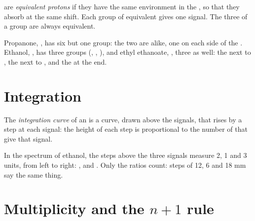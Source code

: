 \begin{definition}\label{def:g12:proton-nmr:equivalent}
 are \emph{equivalent protons} if they
have the same environment in the , so that they absorb at the
same shift. Each group of equivalent  gives one signal. The three
 of a  group are always equivalent.
\end{definition}

\begin{example}\label{ex:g12:proton-nmr:groups}
Propanone, , has six  but one group: the two
 are alike, one on each side of the . Ethanol,
, has three groups (, , ), and
ethyl ethanoate, , three as well: the 
next to , the  next to , and the  at the
end.
\end{example}

\section{Integration}

\begin{definition}\label{def:g12:proton-nmr:integration}
The \emph{integration curve} of an 
is a curve, drawn above the signals, that rises by a step at each signal:
the height of each step is proportional to the number of  that
give that signal.
\end{definition}

\begin{example}\label{ex:g12:proton-nmr:steps}
In the spectrum of ethanol, the steps above the three signals measure 2,
1 and 3 units, from left to right: ,  and . Only
the ratios count: steps of 12, 6 and 18 mm say the same thing.
\end{example}

\section{Multiplicity and the \texorpdfstring{$n+1$}{n+1} rule}


